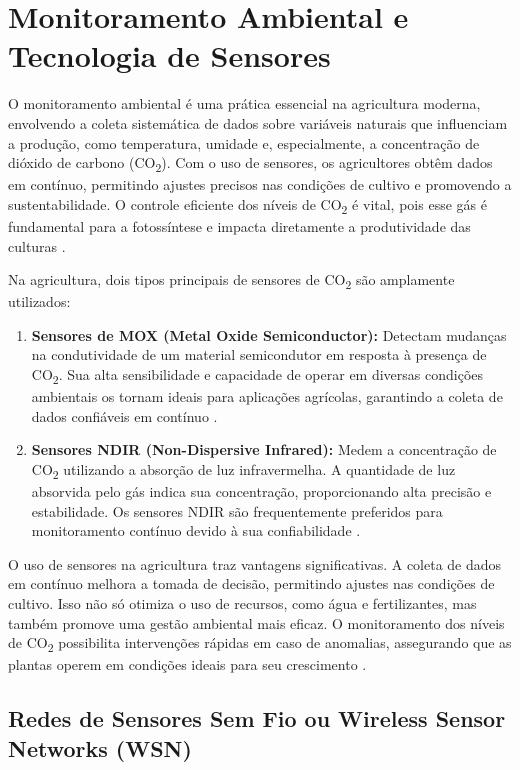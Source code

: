 \section{Monitoramento Ambiental e Tecnologia de Sensores}

O monitoramento ambiental é uma prática essencial na agricultura moderna, envolvendo a coleta sistemática de dados sobre variáveis naturais que influenciam a produção, como temperatura, umidade e, especialmente, a concentração de dióxido de carbono (CO\textsubscript{2}). Com o uso de sensores, os agricultores obtêm dados em contínuo, permitindo ajustes precisos nas condições de cultivo e promovendo a sustentabilidade. O controle eficiente dos níveis de CO\textsubscript{2} é vital, pois esse gás é fundamental para a fotossíntese e impacta diretamente a produtividade das culturas \cite{NASA2021}.


Na agricultura, dois tipos principais de sensores de CO\textsubscript{2} são amplamente utilizados:

\begin{enumerate}
    \item \textbf{Sensores de MOX (Metal Oxide Semiconductor):} Detectam mudanças na condutividade de um material semicondutor em resposta à presença de CO\textsubscript{2}. Sua alta sensibilidade e capacidade de operar em diversas condições ambientais os tornam ideais para aplicações agrícolas, garantindo a coleta de dados confiáveis em contínuo \cite{liu2018}.
    \item \textbf{Sensores NDIR (Non-Dispersive Infrared):} Medem a concentração de CO\textsubscript{2} utilizando a absorção de luz infravermelha. A quantidade de luz absorvida pelo gás indica sua concentração, proporcionando alta precisão e estabilidade. Os sensores NDIR são frequentemente preferidos para monitoramento contínuo devido à sua confiabilidade \cite{baker2018, williams2022}.
\end{enumerate}

O uso de sensores na agricultura traz vantagens significativas. A coleta de dados em contínuo melhora a tomada de decisão, permitindo ajustes nas condições de cultivo. Isso não só otimiza o uso de recursos, como água e fertilizantes, mas também promove uma gestão ambiental mais eficaz. O monitoramento dos níveis de CO\textsubscript{2} possibilita intervenções rápidas em caso de anomalias, assegurando que as plantas operem em condições ideais para seu crescimento \cite{FAO2020}.

\subsection{Redes de Sensores Sem Fio ou Wireless Sensor Networks (WSN)}

